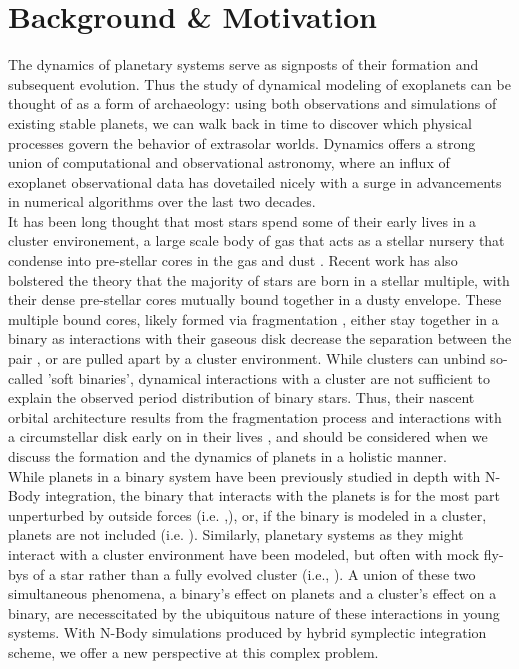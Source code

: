 \documentclass{aastex631}
\begin{document}
\section{Background \& Motivation}
\indent The dynamics of planetary systems serve as signposts of their formation and subsequent evolution. Thus the study of dynamical modeling 
of exoplanets can be thought of as a form of archaeology: using both observations and simulations of existing stable planets, we can walk back in 
time to discover which physical processes govern the behavior of extrasolar worlds.  Dynamics offers a strong union of computational 
and observational astronomy, where an influx of exoplanet observational data has dovetailed nicely with a surge in advancements in numerical algorithms
over the last two decades. \\
\indent It has been long thought that most stars spend some of their early lives in a cluster environement, a large scale body of gas that acts as a stellar nursery
 that condense into pre-stellar cores in the gas and dust \citep{lad03}. Recent work\citep{sad17} has also bolstered the theory\citep{kro95} that the majority of stars 
 are born in a stellar multiple, with their dense pre-stellar cores mutually bound together in a dusty envelope. 
 These multiple bound cores, likely formed
 via fragmentation \citep{bon94,bat03,tur09}, either stay together in a binary as interactions with their gaseous
 disk decrease the separation between the pair \citep{bat00,bat03}, or are pulled apart by a cluster environment\citep{kro01}. 
 While clusters can unbind so-called 'soft binaries'\citep{kro01}, dynamical interactions with a cluster are not sufficient to explain the observed
 period distribution of binary stars. Thus, their nascent orbital architecture results from the fragmentation process and interactions with a circumstellar disk
 early on in their lives \citep{krobur01}, and should be considered when we discuss the formation and the dynamics of planets in a holistic manner.\\
 \indent While planets in a binary system have been 
 previously studied in depth with N-Body integration, the binary that interacts with the planets is for the most part unperturbed by outside forces 
 (i.e. \cite{hol99},\cite{hag07}),
 or, if the binary is modeled in a cluster, planets are not included (i.e. \cite{krobur01}). Similarly, planetary systems as they might interact with a cluster environment
 have been modeled, but often with mock fly-bys of a star rather than a fully evolved cluster (i.e., \cite{rec09,cat20}). A union of these two simultaneous phenomena,
 a binary's effect on planets and a cluster's effect on a binary, are necesscitated by the ubiquitous nature of these interactions in young systems. With N-Body simulations
 produced by hybrid symplectic integration scheme, we offer a new perspective at this complex problem. 
\end{document}
